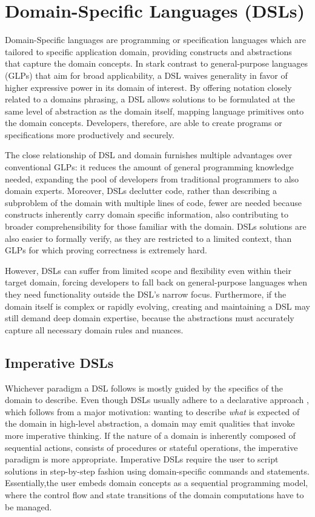 \section{Domain-Specific Languages (DSLs)}

Domain-Specific languages are programming or specification languages which are tailored to specific application domain, providing constructs and abstractions
that capture the domain concepts. \cite{whenHowDSL} In stark contrast to general-purpose languages (GLPs) that aim for broad applicability, a DSL waives generality in favor
of higher expressive power in its domain of interest. By offering notation closely related to a domains phrasing, a DSL allows solutions to be formulated at the same level
of abstraction as the domain itself, mapping language primitives onto the domain concepts. Developers, therefore, are able to create programs or specifications more
productively and securely.

The close relationship of DSL and domain furnishes multiple advantages over conventional GLPs: it reduces the amount of general programming knowledge needed,
expanding the pool of developers from traditional programmers to also domain experts. Moreover, DSLs declutter code, rather than describing a subproblem of the domain
with multiple lines of code, fewer are needed because constructs inherently carry domain specific information, also contributing to broader comprehensibility for those familiar with the domain.
DSLs solutions are also easier to formally verify, as they are restricted to a limited context, than GLPs for which proving correctness is extremely hard.

However, DSLs can suffer from limited scope and flexibility even within their target domain, forcing developers to fall back on general-purpose languages when they need functionality outside the
DSL's narrow focus. Furthermore, if the domain itself is complex or rapidly evolving, creating and maintaining a DSL may still demand deep domain expertise, because the abstractions must
accurately capture all necessary domain rules and nuances.

\subsection{Imperative DSLs}

Whichever paradigm a DSL follows is mostly guided by the specifics of the domain to describe. Even though DSLs usually adhere to a declarative approach \cite{sigplanDSL}, which follows from a
major motivation: wanting to describe \textit{what} is expected of the domain in high-level abstraction, a domain may emit qualities that invoke more imperative thinking.
If the nature of a domain is inherently composed of sequential actions, consists of procedures or stateful operations, the imperative paradigm is more appropriate.
Imperative DSLs require the user to script solutions in step-by-step fashion using domain-specific commands and statements. Essentially,the user embeds domain concepts as a sequential programming model,
where the control flow and state transitions of the domain computations have to be managed.

